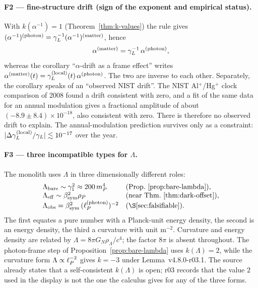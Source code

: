 \paragraph{F2 --- fine-structure drift (sign of the exponent and empirical status).}
With \(k(\alpha^{-1})=1\) (Theorem~\ref{thm:k-values}) the rule gives
\((\alpha^{-1})^{(\mathrm{photon})}=\gamma_L^{-1}(\alpha^{-1})^{(\mathrm{matter})}\), hence
\[
\alpha^{(\mathrm{matter})}=\gamma_L^{-1}\,\alpha^{(\mathrm{photon})},
\]
whereas the corollary ``\(\alpha\)-drift as a frame effect'' writes
\(\alpha^{(\mathrm{matter})}(t)=\gamma_L^{(\mathrm{local})}(t)\,\alpha^{(\mathrm{photon})}\).  The two
are inverse to each other.  Separately, the corollary speaks of an ``observed NIST drift''.  The
NIST Al\(^+\)/Hg\(^+\) clock comparison of 2008 found a drift consistent with zero, and a fit of
the same data for an annual modulation gives a fractional amplitude of about
\((-8.9\pm8.4)\times10^{-18}\), also consistent with zero.  There is therefore no observed drift
to explain.  The annual-modulation prediction survives only as a constraint:
\(|\Delta\gamma_L^{(\mathrm{local})}/\gamma_L|\lesssim10^{-17}\) over the year.

\paragraph{F3 --- three incompatible types for \(\Lambda\).}
The monolith uses \(\Lambda\) in three dimensionally different roles:
\[
\begin{array}{ll}
\Lambda_{\mathrm{bare}}\sim\gamma_1^2\approx200\,m_P^4 & (\text{Prop.~\ref{prop:bare-lambda}}),\\
\Lambda_{\mathrm{eff}}\sim\bsym^2\rho_P & (\text{near Thm.~\ref{thm:dark-offset}}),\\
\Lambda_{\mathrm{obs}}=\bsym^2\,(\lP^{(\mathrm{photon})})^{-2} & (\text{\S\ref{sec:falsifiable}}).
\end{array}
\]
The first equates a pure number with a Planck-unit energy density, the second is an energy
density, the third a curvature with unit \(\mathrm{m}^{-2}\).  Curvature and energy density are
related by \(\Lambda=8\pi G_N\rho_\Lambda/c^4\); the factor \(8\pi\) is absent throughout.  The
photon-frame step of Proposition~\ref{prop:bare-lambda} uses \(k(\Lambda)=2\), while the
curvature form \(\Lambda\propto\ell_P^{-2}\) gives \(k=-3\) under Lemma~v4.8.0-r03.1.  The source
already states that a self-consistent \(k(\Lambda)\) is open; r03 records that the value \(2\)
used in the display is not the one the calculus gives for any of the three forms.

